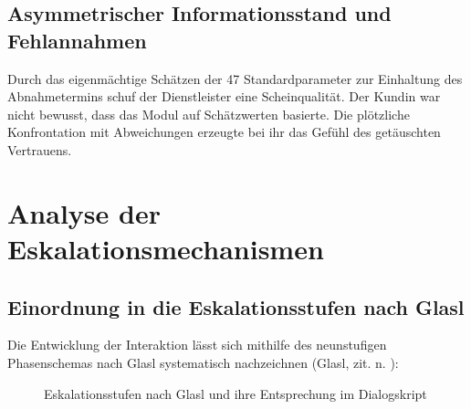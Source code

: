 \subsection{Asymmetrischer Informationsstand und Fehlannahmen}
Durch das eigenmächtige Schätzen der 47 Standardparameter zur Einhaltung des Abnahmetermins schuf der Dienstleister eine Scheinqualität. Der Kundin war nicht bewusst, dass das Modul auf Schätzwerten basierte. Die plötzliche Konfrontation mit Abweichungen erzeugte bei ihr das Gefühl des getäuschten Vertrauens.

\section{Analyse der Eskalationsmechanismen}

\subsection{Einordnung in die Eskalationsstufen nach Glasl}
Die Entwicklung der Interaktion lässt sich mithilfe des neunstufigen Phasenschemas nach Glasl systematisch nachzeichnen (Glasl, zit. n. \cite[S.~33--40]{5}):

\begin{figure}[H]
\centering
{}
\caption{Eskalationsstufen nach Glasl und ihre Entsprechung im Dialogskript}
\label{fig:glasl-eskalation}
\end{figure}

